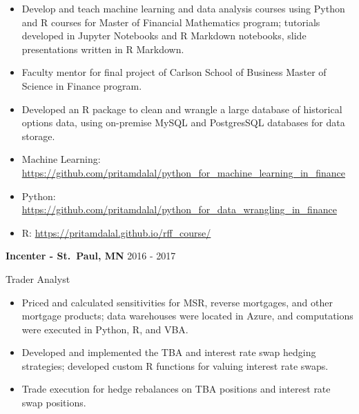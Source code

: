 \documentclass[11pt, a4paper]{awesome-cv}
\begin{document}
\begin{itemize}
\item
  Develop and teach machine learning and data analysis courses using
  Python and R courses for Master of Financial Mathematics program;
  tutorials developed in Jupyter Notebooks and R Markdown notebooks,
  slide presentations written in R Markdown. \vspace{-0.5ex}
\item
  Faculty mentor for final project of Carlson School of Business Master
  of Science in Finance program. \vspace{-0.5ex}
\item
  Developed an R package to clean and wrangle a large database of
  historical options data, using on-premise MySQL and PostgresSQL
  databases for data storage. \vspace{-0.5ex} 
\item
  Machine Learning:
  \href{https://github.com/pritamdalal/python\_for\_machine\_learning\_in\_finance}{https://github.com/pritamdalal/python\_for\_machine\_learning\_in\_finance}
  \vspace{-0.5ex}
\item
  Python:
  \href{https://github.com/pritamdalal/python\_for\_data\_wrangling\_in\_finance}{https://github.com/pritamdalal/python\_for\_data\_wrangling\_in\_finance}
  \vspace{-0.5ex}
\item
  R:
  \href{https://pritamdalal.github.io/rff\_course/}{https://pritamdalal.github.io/rff\_course/}
  \vspace{-0.5ex}
\end{itemize}

\normalsize

\textbf{Incenter - St.~Paul, MN} \hfill 2016 - 2017

\vspace{-1ex}

Trader Analyst

\vspace{-1.5ex}

\small

\begin{itemize}
\item
  Priced and calculated sensitivities for MSR, reverse mortgages, and
  other mortgage products; data warehouses were located in Azure, and
  computations were executed in Python, R, and VBA. \vspace{-0.5ex} 
\item
  Developed and implemented the TBA and interest rate swap hedging
  strategies; developed custom R functions for valuing interest rate
  swaps. \vspace{-0.5ex}
\item
  Trade execution for hedge rebalances on TBA positions and interest
  rate swap positions. \vspace{-0.5ex}
\end{itemize}
\end{document}

